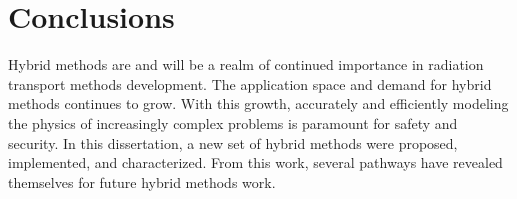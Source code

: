 \chapter{Conclusions}
\label{ch:conclusions}

Hybrid methods are and will be a realm of continued importance in radiation
transport methods development.
The application space and demand for hybrid methods continues to grow. With
this growth, accurately and efficiently modeling the physics of increasingly
complex problems is
paramount for safety and security. In this dissertation, a new set of hybrid
methods were
proposed, implemented, and characterized.
From this work, several pathways have
revealed themselves for future hybrid methods work.





